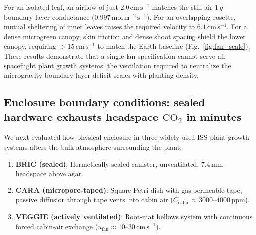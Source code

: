 \documentclass[10pt,twocolumn,a4paper]{article}
\newcommand{\cmsu}{\ensuremath{\mathrm{cm\,s^{-1}}}}
\newcommand{\molms}{\ensuremath{\mathrm{mol\,m^{-2}\,s^{-1}}}}
\begin{document}
For an isolated leaf, an airflow of just \textbf{$2.0\,\cmsu$} matches the still-air $1\,g$ boundary-layer conductance ($0.997\,\molms$). For an overlapping rosette, mutual sheltering of inner leaves raises the required velocity to \textbf{$6.1\,\cmsu$}. For a dense microgreen canopy, skin friction and dense shoot spacing shield the lower canopy, requiring $>15\,\cmsu$ to match the Earth baseline (Fig.~\ref{fig:fan_scale}). These results demonstrate that a single fan specification cannot serve all spaceflight plant growth systems: the ventilation required to neutralize the microgravity boundary-layer deficit scales with planting density.

\subsection*{Enclosure boundary conditions: sealed hardware exhausts headspace $\mathrm{CO_2}$ in minutes}\label{sec:hardware}

We next evaluated how physical enclosure in three widely used ISS plant growth systems alters the bulk atmosphere surrounding the plant:
\begin{enumerate}
    \item \textbf{BRIC (sealed)}: Hermetically sealed canister, unventilated, $7.4\,\mathrm{mm}$ headspace above agar.
    \item \textbf{CARA (micropore-taped)}: Square Petri dish with gas-permeable tape, passive diffusion through tape vents into cabin air ($C_{\text{cabin}} \approx 3000\text{--}4000\,\mathrm{ppm}$).
    \item \textbf{VEGGIE (actively ventilated)}: Root-mat bellows system with continuous forced cabin-air exchange ($u_{\text{fan}} \approx 10\text{--}30\,\cmsu$).
\end{enumerate}
\end{document}
